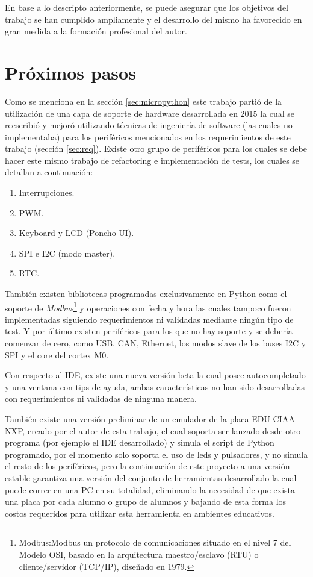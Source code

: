 En base a lo descripto anteriormente, se puede asegurar que los objetivos del trabajo se han cumplido ampliamente y el desarrollo del mismo ha favorecido en gran medida a la formación profesional del autor.


\section{Próximos pasos}

Como se menciona en la sección \ref{sec:micropython} este trabajo partió de la utilización de una capa de soporte de hardware desarrollada en 2015 la cual se reescribió y mejoró utilizando técnicas de ingeniería de software (las cuales no implementaba) para los periféricos mencionados en los requerimientos de este trabajo (sección \ref{sec:req}). Existe otro grupo de periféricos para los cuales se debe hacer este mismo trabajo de refactoring e implementación de tests, los cuales se detallan a continuación:

\begin{enumerate}
	\item  Interrupciones.
	\item  PWM.
	\item  Keyboard y LCD (Poncho UI). 
	\item  SPI e I2C (modo master).
	\item  RTC.
\end{enumerate}

También existen bibliotecas programadas exclusivamente en Python como el soporte de \textit{Modbus}\footnote{Modbus:Modbus un protocolo de comunicaciones situado en el nivel 7 del Modelo OSI, basado en la arquitectura maestro/esclavo (RTU) o cliente/servidor (TCP/IP), diseñado en 1979.} y operaciones con fecha y hora las cuales tampoco fueron implementadas siguiendo requerimientos ni validadas mediante ningún tipo de test. Y por último existen periféricos para los que no hay soporte y se debería comenzar de cero, como USB, CAN, Ethernet, los modos slave de los buses I2C y SPI y el core del cortex M0.

Con respecto al IDE, existe una nueva versión beta la cual posee autocompletado y una ventana con tips de ayuda, ambas características no han sido desarrolladas con requerimientos ni validadas de ninguna manera.

También existe una versión preliminar de un emulador de la placa EDU-CIAA-NXP, creado por el autor de esta trabajo, el cual soporta ser lanzado desde otro programa (por ejemplo el IDE desarrollado) y simula el script de Python programado, por el momento solo soporta el uso de leds y pulsadores, y no simula el resto de los periféricos, pero la continuación de este proyecto a una versión estable garantiza una versión del conjunto de herramientas desarrollado la cual puede correr en una PC en su totalidad, eliminando la necesidad de que exista una placa por cada alumno o grupo de alumnos y bajando de esta forma los costos requeridos para utilizar esta herramienta en ambientes educativos.

